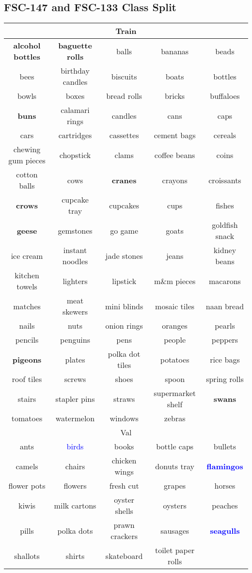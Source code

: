 \documentclass[letterpaper, 11pt]{IEEEtran}
\begin{document}
\subsection{FSC-147 and FSC-133 Class Split}\label{append_classes}
\begin{table*}[!ht]
    \centering
    \fontsize{9}{9}\selectfont
    \begin{tabular}{ccccc}
 \toprule

\multicolumn{5}{c}{Train} \\
\midrule
\textbf{alcohol bottles}&\textbf{baguette rolls}&balls&bananas&beads\\
bees&birthday candles&biscuits&boats&bottles\\
bowls&boxes&bread rolls&bricks&buffaloes\\
\textbf{buns}&calamari rings&candles&cans&caps\\
cars&cartridges&cassettes&cement bags&cereals\\
chewing gum pieces&chopstick&clams&coffee beans&coins\\
cotton balls&cows&\textbf{cranes}&crayons&croissants\\
\textbf{crows}&cupcake tray&cupcakes&cups&fishes\\
\textbf{geese}&gemstones&go game&goats&goldfish snack\\
ice cream&instant noodles&jade stones&jeans&kidney beans\\
kitchen towels&lighters&lipstick&m\&m pieces&macarons\\
matches&meat skewers&mini blinds&mosaic tiles&naan bread\\
nails&nuts&onion rings&oranges&pearls\\
pencils&penguins&pens&people&peppers\\
\textbf{pigeons}&plates&polka dot tiles&potatoes&rice bags\\
roof tiles&screws&shoes&spoon&spring rolls\\
stairs&stapler pins&straws&supermarket shelf&\textbf{swans}\\
tomatoes&watermelon&windows&zebras\\

\midrule
\multicolumn{5}{c}{Val} \\
\midrule
ants&\textcolor{blue}{birds}&books&bottle caps&bullets\\
camels&chairs&chicken wings&donuts tray&\textbf{\textcolor{blue}{flamingos}}\\
flower pots&flowers&fresh cut&grapes&horses\\
kiwis&milk cartons&oyster shells&oysters&peaches\\
pills&polka dots&prawn crackers&sausages&\textbf{\textcolor{blue}{seagulls}}\\
shallots&shirts&skateboard&toilet paper rolls\\


\end{tabular}
\end{table*}
\end{document}
